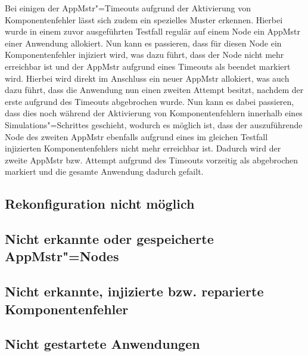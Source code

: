 Bei einigen der \ac{AppMstr}"=Timeouts aufgrund der Aktivierung von Komponentenfehler lässt sich zudem ein spezielles Muster erkennen.
Hierbei wurde in einem zuvor ausgeführten Testfall regulär auf einem Node ein \ac{AppMstr} einer Anwendung allokiert.
Nun kann es passieren, dass für diesen Node ein Komponentenfehler injiziert wird, was dazu führt, dass der Node nicht mehr erreichbar ist und der \ac{AppMstr} aufgrund eines Timeouts als beendet markiert wird.
Hierbei wird direkt im Anschluss ein neuer \ac{AppMstr} allokiert, was auch dazu führt, dass die Anwendung nun einen zweiten Attempt besitzt, nachdem der erste aufgrund des Timeouts abgebrochen wurde.
Nun kann es dabei passieren, dass dies noch während der Aktivierung von Komponentenfehlern innerhalb eines Simulations"=Schrittes geschieht, wodurch es möglich ist, dass der auszuführende Node des zweiten \ac{AppMstr} ebenfalls aufgrund eines im gleichen Testfall injizierten Komponentenfehlers nicht mehr erreichbar ist.
Dadurch wird der zweite \ac{AppMstr} bzw. Attempt aufgrund des Timeouts vorzeitig als abgebrochen markiert und die gesamte Anwendung dadurch gefailt.

\subsection{Rekonfiguration nicht möglich}
\label{sec:noReconfig}






\subsection{Nicht erkannte oder gespeicherte \ac{AppMstr}"=Nodes}
\label{sec:noDetectedHost2}




\subsection{Nicht erkannte, injizierte bzw. reparierte Komponentenfehler}
\label{sec:noDetectedFault}


\subsection{Nicht gestartete Anwendungen}
\label{sec:notStartedApps}


